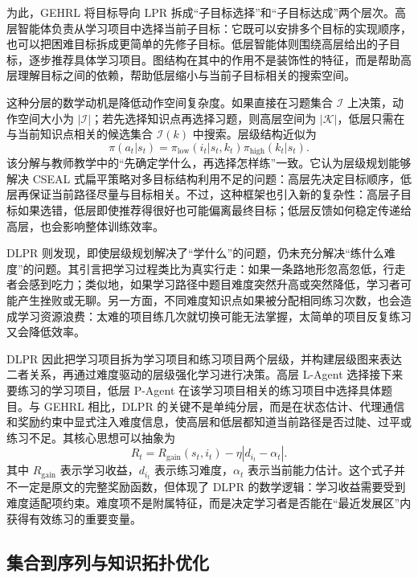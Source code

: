 \documentclass[UTF8,a4paper,zihao=-4]{ctexart}
\begin{document}
为此，GEHRL 将目标导向 LPR 拆成“子目标选择”和“子目标达成”两个层次。高层智能体负责从学习项目中选择当前子目标：它既可以安排多个目标的实现顺序，也可以把困难目标拆成更简单的先修子目标。低层智能体则围绕高层给出的子目标，逐步推荐具体学习项目。图结构在其中的作用不是装饰性的特征，而是帮助高层理解目标之间的依赖，帮助低层缩小与当前子目标相关的搜索空间。

这种分层的数学动机是降低动作空间复杂度。如果直接在习题集合 $\mathcal{I}$ 上决策，动作空间大小为 $|\mathcal{I}|$；若先选择知识点再选择习题，则高层空间为 $|\mathcal{K}|$，低层只需在与当前知识点相关的候选集合 $\mathcal{I}(k)$ 中搜索。层级结构近似为
\begin{equation}
\pi(a_t|s_t)=\pi_{\mathrm{low}}(i_t|s_t,k_t)\pi_{\mathrm{high}}(k_t|s_t).
\end{equation}
该分解与教师教学中的“先确定学什么，再选择怎样练”一致。它认为层级规划能够解决 CSEAL 式扁平策略对多目标结构利用不足的问题：高层先决定目标顺序，低层再保证当前路径尽量与目标相关。不过，这种框架也引入新的复杂性：高层子目标如果选错，低层即使推荐得很好也可能偏离最终目标；低层反馈如何稳定传递给高层，也会影响整体训练效率。

DLPR 则发现，即使层级规划解决了“学什么”的问题，仍未充分解决“练什么难度”的问题。其引言把学习过程类比为真实行走：如果一条路地形忽高忽低，行走者会感到吃力；类似地，如果学习路径中题目难度突然升高或突然降低，学习者可能产生挫败或无聊。另一方面，不同难度知识点如果被分配相同练习次数，也会造成学习资源浪费：太难的项目练几次就切换可能无法掌握，太简单的项目反复练习又会降低效率\cite{Zhang2024DLPR}。

DLPR 因此把学习项目拆为学习项目和练习项目两个层级，并构建层级图来表达二者关系，再通过难度驱动的层级强化学习进行决策。高层 L-Agent 选择接下来要练习的学习项目，低层 P-Agent 在该学习项目相关的练习项目中选择具体题目。与 GEHRL 相比，DLPR 的关键不是单纯分层，而是在状态估计、代理通信和奖励约束中显式注入难度信息，使高层和低层都知道当前路径是否过陡、过平或练习不足。其核心思想可以抽象为
\begin{equation}
R_t=R_{\mathrm{gain}}(s_t,i_t)-\eta |d_{i_t}-\alpha_t|.
\end{equation}
其中 $R_{\mathrm{gain}}$ 表示学习收益，$d_{i_t}$ 表示练习难度，$\alpha_t$ 表示当前能力估计。这个式子并不一定是原文的完整奖励函数，但体现了 DLPR 的数学逻辑：学习收益需要受到难度适配项约束。难度项不是附属特征，而是决定学习者是否能在“最近发展区”内获得有效练习的重要变量。

\subsection{集合到序列与知识拓扑优化}
\end{document}

